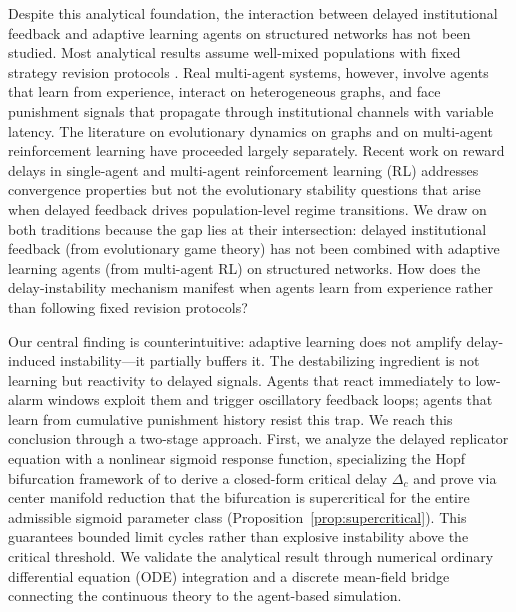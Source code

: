 Despite this analytical foundation, the interaction between delayed institutional feedback and adaptive learning agents on structured networks has not been studied. Most analytical results assume well-mixed populations with fixed strategy revision protocols \citep{miekisz2008evolutionary}. Real multi-agent systems, however, involve agents that learn from experience, interact on heterogeneous graphs, and face punishment signals that propagate through institutional channels with variable latency. The literature on evolutionary dynamics on graphs \citep{ohtsuki2006simple, santos2005scalefree, perc2013evolutionary, perc2017statistical, mcavoy2022social} and on multi-agent reinforcement learning \citep{sutton2018reinforcement, zhang2021marl_survey, gronauer2022marl} have proceeded largely separately. Recent work on reward delays in single-agent and multi-agent reinforcement learning (RL) \citep{bouteiller2020delays, zhang2023marl} addresses convergence properties but not the evolutionary stability questions that arise when delayed feedback drives population-level regime transitions. We draw on both traditions because the gap lies at their intersection: delayed institutional feedback (from evolutionary game theory) has not been combined with adaptive learning agents (from multi-agent RL) on structured networks. How does the delay-instability mechanism manifest when agents learn from experience rather than following fixed revision protocols?

Our central finding is counterintuitive: adaptive learning does not amplify delay-induced instability---it partially buffers it. The destabilizing ingredient is not learning but reactivity to delayed signals. Agents that react immediately to low-alarm windows exploit them and trigger oscillatory feedback loops; agents that learn from cumulative punishment history resist this trap. We reach this conclusion through a two-stage approach. First, we analyze the delayed replicator equation with a nonlinear sigmoid response function, specializing the Hopf bifurcation framework of \citet{wesson2016hopf} to derive a closed-form critical delay $\Delta_c$ and prove via center manifold reduction that the bifurcation is supercritical for the entire admissible sigmoid parameter class (Proposition~\ref{prop:supercritical}). This guarantees bounded limit cycles rather than explosive instability above the critical threshold. We validate the analytical result through numerical ordinary differential equation (ODE) integration and a discrete mean-field bridge connecting the continuous theory to the agent-based simulation.

